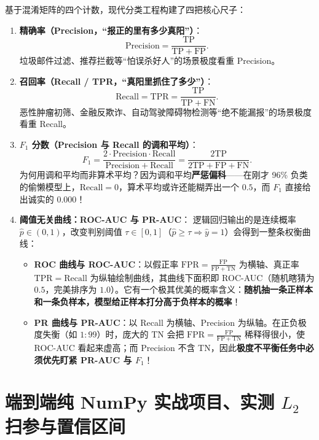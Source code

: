 基于混淆矩阵的四个计数，现代分类工程构建了四把核心尺子：
\begin{enumerate}
  \item \textbf{精确率（Precision，“报正的里有多少真阳”）}：
  \[
    \mathrm{Precision} = \frac{\mathrm{TP}}{\mathrm{TP} + \mathrm{FP}}.
  \]
  垃圾邮件过滤、推荐拦截等“怕误杀好人”的场景极度看重 Precision。
  \item \textbf{召回率（Recall / TPR，“真阳里抓住了多少”）}：
  \[
    \mathrm{Recall} = \mathrm{TPR} = \frac{\mathrm{TP}}{\mathrm{TP} + \mathrm{FN}}.
  \]
  恶性肿瘤初筛、金融反欺诈、自动驾驶障碍物检测等“绝不能漏报”的场景极度看重 Recall。
  \item \textbf{$F_1$ 分数（Precision 与 Recall 的调和平均）}：
  \[
    F_1 = \frac{2\cdot \mathrm{Precision}\cdot \mathrm{Recall}}{\mathrm{Precision} + \mathrm{Recall}} = \frac{2\mathrm{TP}}{2\mathrm{TP} + \mathrm{FP} + \mathrm{FN}}.
  \]
  为何用调和平均而非算术平均？因为调和平均\textbf{严惩偏科}——在刚才 96\% 负类的偷懒模型上，$\mathrm{Recall} = 0$，算术平均或许还能糊弄出一个 $0.5$，而 $F_1$ 直接给出诚实的 $0.000$！
  \item \textbf{阈值无关曲线：ROC-AUC 与 PR-AUC}：
  逻辑回归输出的是连续概率 $\hat{p} \in (0, 1)$，改变判别阈值 $\tau \in [0, 1]$（$\hat{p} \ge \tau \Rightarrow \hat{y}=1$）会得到一整条权衡曲线：
  \begin{itemize}
    \item \textbf{ROC 曲线与 ROC-AUC}：以假正率 $\mathrm{FPR} = \frac{\mathrm{FP}}{\mathrm{FP}+\mathrm{TN}}$ 为横轴、真正率 $\mathrm{TPR} = \mathrm{Recall}$ 为纵轴绘制曲线，其曲线下面积即 ROC-AUC（随机瞎猜为 $0.5$，完美排序为 $1.0$）。它有一个极其优美的概率含义：\textbf{随机抽一条正样本和一条负样本，模型给正样本打分高于负样本的概率}！
    \item \textbf{PR 曲线与 PR-AUC}：以 Recall 为横轴、Precision 为纵轴。在正负极度失衡（如 $1:99$）时，庞大的 TN 会把 $\mathrm{FPR} = \frac{\mathrm{FP}}{\mathrm{FP}+\mathrm{TN}}$ 稀释得很小，使 ROC-AUC 看起来虚高；而 Precision 不含 TN，因此\textbf{极度不平衡任务中必须优先盯紧 PR-AUC 与 $F_1$}！
  \end{itemize}
\end{enumerate}

\section{端到端纯 NumPy 实战项目、实测 $L_2$ 扫参与置信区间}
\label{sec:ch6-capstone}

